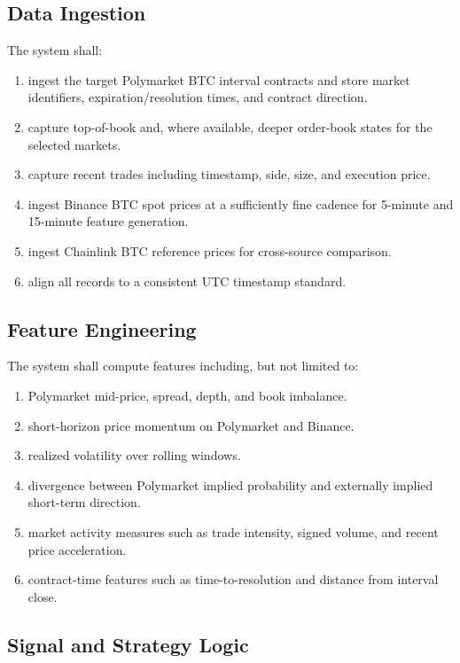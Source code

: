 \documentclass[11pt, letterpaper]{article}
\begin{document}
\subsection{Data Ingestion}

The system shall:

\begin{enumerate}[label=FR-\arabic*, nosep]
    \item ingest the target Polymarket BTC interval contracts and store market identifiers, expiration/resolution times, and contract direction.
    \item capture top-of-book and, where available, deeper order-book states for the selected markets.
    \item capture recent trades including timestamp, side, size, and execution price.
    \item ingest Binance BTC spot prices at a sufficiently fine cadence for 5-minute and 15-minute feature generation.
    \item ingest Chainlink BTC reference prices for cross-source comparison.
    \item align all records to a consistent UTC timestamp standard.
\end{enumerate}

\subsection{Feature Engineering}

The system shall compute features including, but not limited to:

\begin{enumerate}[label=FR-\arabic*, resume, nosep]
    \item Polymarket mid-price, spread, depth, and book imbalance.
    \item short-horizon price momentum on Polymarket and Binance.
    \item realized volatility over rolling windows.
    \item divergence between Polymarket implied probability and externally implied short-term direction.
    \item market activity measures such as trade intensity, signed volume, and recent price acceleration.
    \item contract-time features such as time-to-resolution and distance from interval close.
\end{enumerate}

\subsection{Signal and Strategy Logic}
\end{document}
